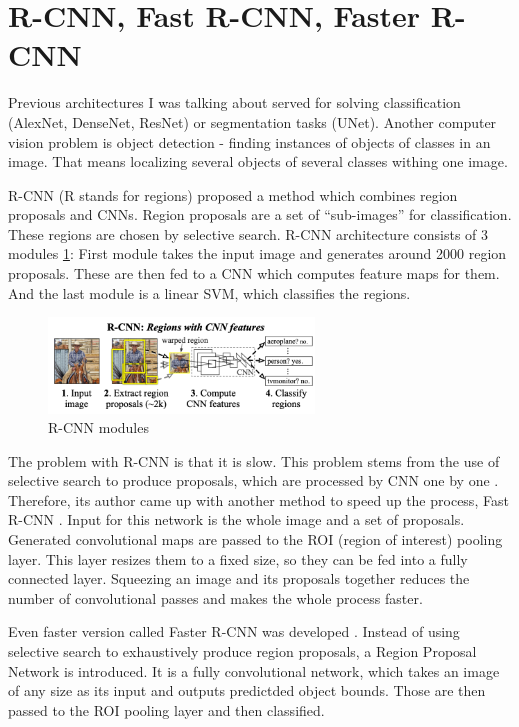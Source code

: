 \section{R-CNN, Fast R-CNN, Faster R-CNN}
Previous architectures I was talking about served for solving classification (AlexNet, DenseNet, ResNet) or segmentation tasks (UNet). Another computer vision problem is object detection - finding instances of objects of classes in an image. That means localizing several objects of several classes withing one image.

R-CNN \cite{rcnn2014} (R stands for regions) proposed a method which combines region proposals and CNNs. Region proposals are a set of ``sub-images'' for classification. These regions are chosen by selective search. R-CNN architecture consists of 3 modules \ref{fig:rcnn}: First module takes the input image and generates around 2000 region proposals. These are then fed to a CNN which computes feature maps for them. And the last module is a linear SVM, which classifies the regions.

\begin{figure}[ht!]
    \centering
    \includegraphics[width=200pt]{images/r-cnn.png}
    \caption[R-CNN modules]{R-CNN modules \cite{rcnn2014}}
    \label{fig:rcnn}
\end{figure}

The problem with R-CNN is that it is slow. This problem stems from the use of selective search to produce proposals, which are processed by CNN one by one . Therefore, its author came up with another method to speed up the process, Fast R-CNN \cite{fast-rcnn2015}. Input for this network is the whole image and a set of proposals. Generated convolutional maps are passed to the ROI (region of interest) pooling layer. This layer resizes them to a fixed size, so they can be fed into a fully connected layer. Squeezing an image and its proposals together reduces the number of convolutional passes and makes the whole process faster. 

Even faster version called Faster R-CNN was developed \cite{faster-rcnn2017}. Instead of using selective search to exhaustively produce region proposals, a Region Proposal Network is introduced. It is a fully convolutional network, which takes an image of any size as its input and outputs predictded object bounds. Those are then passed to the ROI pooling layer and then classified. 